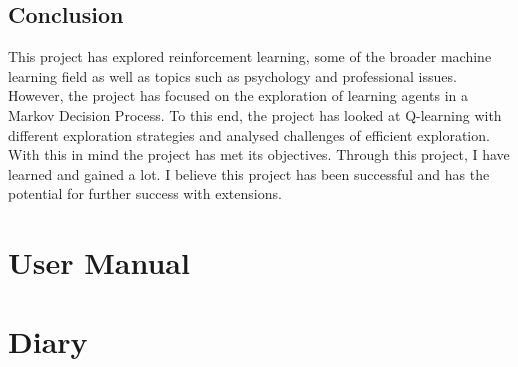 \documentclass[]{final_report}
\begin{document}
\section{Conclusion}

This project has explored reinforcement learning, some of the broader machine learning field as well as topics such as psychology and professional issues. However, the project has focused on the exploration of learning agents in a Markov Decision Process. To this end, the project has looked at Q-learning with different exploration strategies and analysed challenges of efficient exploration. With this in mind the project has met its objectives. Through this project, I have learned and gained a lot. I believe this project has been successful and has the potential for further success with extensions. 

\newpage




\appendix


\chapter{User Manual}

% 

\chapter{Diary}

% 



\label{endpage}
\end{document}
